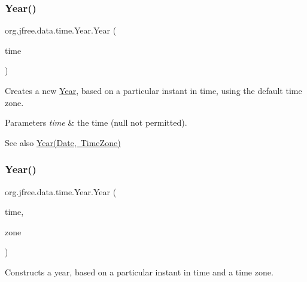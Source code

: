 \subsubsection{\texorpdfstring{Year()}{Year()}\hspace{0.1cm}{\footnotesize\ttfamily [3/5]}}
{\footnotesize\ttfamily org.\+jfree.\+data.\+time.\+Year.\+Year (\begin{DoxyParamCaption}\item[{Date}]{time }\end{DoxyParamCaption})}

Creates a new {\ttfamily \mbox{\hyperlink{classorg_1_1jfree_1_1data_1_1time_1_1_year}{Year}}}, based on a particular instant in time, using the default time zone.


\begin{DoxyParams}{Parameters}
{\em time} & the time ({\ttfamily null} not permitted).\\
\hline
\end{DoxyParams}
\begin{DoxySeeAlso}{See also}
\mbox{\hyperlink{classorg_1_1jfree_1_1data_1_1time_1_1_year_aa2e6f6acded9ea74ce136c04cb6d55cc}{Year(\+Date, Time\+Zone)}} 
\end{DoxySeeAlso}
\mbox{\label{classorg_1_1jfree_1_1data_1_1time_1_1_year_aa2e6f6acded9ea74ce136c04cb6d55cc}} 
\subsubsection{\texorpdfstring{Year()}{Year()}\hspace{0.1cm}{\footnotesize\ttfamily [4/5]}}
{\footnotesize\ttfamily org.\+jfree.\+data.\+time.\+Year.\+Year (\begin{DoxyParamCaption}\item[{Date}]{time,  }\item[{Time\+Zone}]{zone }\end{DoxyParamCaption})}

Constructs a year, based on a particular instant in time and a time zone.


